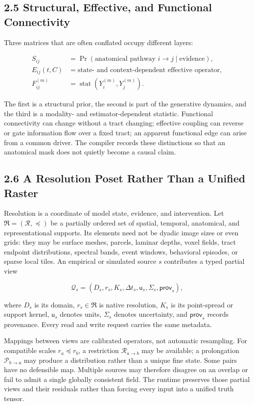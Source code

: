 \subsection{2.5 Structural, Effective, and Functional Connectivity}

Three matrices that are often conflated occupy different layers:

\[
\begin{aligned}
S_{ij}&=\Pr(\text{anatomical pathway }i\rightarrow j\mid\text{evidence}),\\
E_{ij}(t,C)&=\text{state- and context-dependent effective operator},\\
F_{ij}^{(m)}&=\operatorname{stat}\!\left(Y_i^{(m)},Y_j^{(m)}\right).
\end{aligned}
\]

The first is a structural prior, the second is part of the generative
dynamics, and the third is a modality- and estimator-dependent statistic.
Functional connectivity can change without a tract changing; effective
coupling can reverse or gate information flow over a fixed tract; an apparent
functional edge can arise from a common driver. The compiler records these
distinctions so that an anatomical mask does not quietly become a causal claim.

\subsection{2.6 A Resolution Poset Rather Than a Unified Raster}

Resolution is a coordinate of model state, evidence, and intervention. Let
\(\mathfrak{R}=(\mathcal{R},\preceq)\) be a partially ordered set of spatial,
temporal, anatomical, and representational supports. Its elements need not be
dyadic image sizes or even grids: they may be surface meshes, parcels, laminar
depths, voxel fields, tract endpoint distributions, spectral bands, event
windows, behavioral episodes, or sparse local tiles. An empirical or simulated
source \(s\) contributes a typed partial view

\[
\mathcal{Q}_s=
\left(D_s,r_s,K_s,\Delta t_s,\mathsf{u}_s,
\Sigma_s,\mathsf{prov}_s\right),
\]

where \(D_s\) is its domain, \(r_s\in\mathfrak{R}\) is native resolution,
\(K_s\) is its point-spread or support kernel, \(\mathsf{u}_s\) denotes units,
\(\Sigma_s\) denotes uncertainty, and \(\mathsf{prov}_s\) records provenance.
Every read and write request carries the same metadata.

Mappings between views are calibrated operators, not automatic resampling.
For compatible scales \(r_a\preceq r_b\), a restriction
\(\mathcal{R}_{a\rightarrow b}\) may be available; a prolongation
\(\mathcal{P}_{b\rightarrow a}\) may produce a distribution rather than a
unique fine state. Some pairs have no defensible map. Multiple sources may
therefore disagree on an overlap or fail to admit a single globally consistent
field. The runtime preserves those partial views and their residuals rather
than forcing every input into a unified truth tensor.

